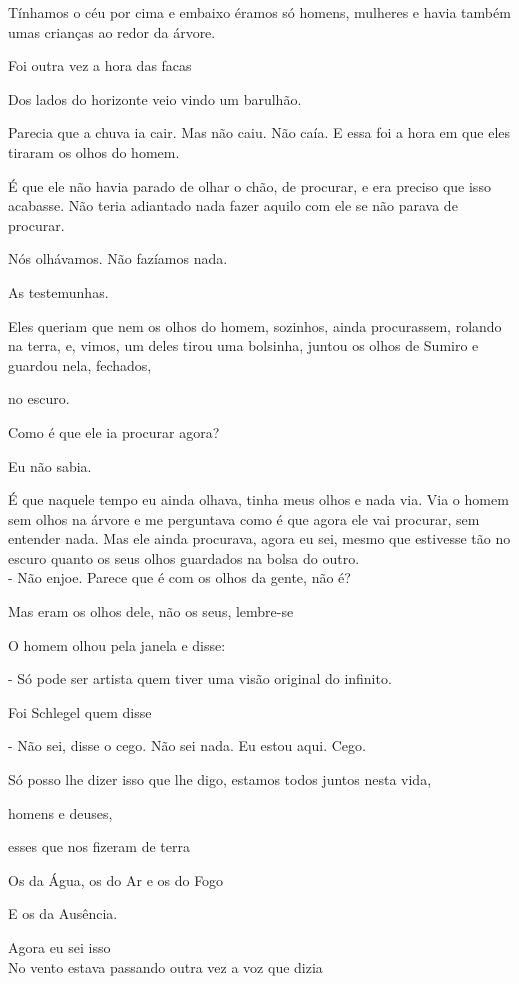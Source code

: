 Tínhamos o céu por cima e embaixo éramos só homens, mulheres e havia
também umas crianças ao redor da árvore.

Foi outra vez a hora das facas

Dos lados do horizonte veio vindo um barulhão.

Parecia que a chuva ia cair. Mas não caiu. Não caía. E essa foi a hora
em que eles tiraram os olhos do homem.

É que ele não havia parado de olhar o chão, de procurar, e era preciso
que isso acabasse. Não teria adiantado nada fazer aquilo com ele se não
parava de procurar.

Nós olhávamos. Não fazíamos nada.

As testemunhas.

Eles queriam que nem os olhos do homem, sozinhos, ainda procurassem,
rolando na terra, e, vimos, um deles tirou uma bolsinha, juntou os olhos
de Sumiro e guardou nela, fechados,

no escuro.

Como é que ele ia procurar agora?

Eu não sabia.

É que naquele tempo eu ainda olhava, tinha meus olhos e nada via. Via o
homem sem olhos na árvore e me perguntava como é que agora ele vai
procurar, sem entender nada. Mas ele ainda procurava, agora eu sei,
mesmo que estivesse tão no escuro quanto os seus olhos guardados na
bolsa do outro.\\

- Não enjoe. Parece que é com os olhos da gente, não é?

Mas eram os olhos dele, não os seus, lembre-se

O homem olhou pela janela e disse:

- Só pode ser artista quem tiver uma visão original do infinito.

Foi Schlegel quem disse

- Não sei, disse o cego. Não sei nada. Eu estou aqui. Cego.

Só posso lhe dizer isso que lhe digo, estamos todos juntos nesta vida,

homens e deuses,

esses que nos fizeram de terra

Os da Água, os do Ar e os do Fogo

E os da Ausência.

Agora eu sei isso\\

No vento estava passando outra vez a voz que dizia\\

